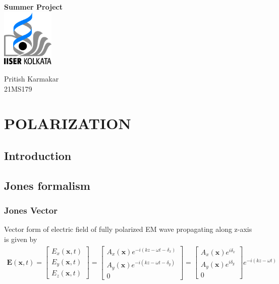 \documentclass[11pt,a4paper]{article}
\author{Pritish Karmakar}
\numberwithin{equation}{section}
\begin{document}
	\begin{titlepage}
		\vspace*{3.5cm}
		\centering
		{\Huge\bfseries Summer Project}\\
		\vspace{5cm}
		\includegraphics[width=2.5cm]{iiserk.png}

		\vspace{5cm}
		
		{\LARGE Pritish Karmakar\\}
		\vspace{0.3cm}
		{21MS179}
		\vfill
		
		
		\clearpage
		\tableofcontents
		\clearpage
		\listoftables
		\lstlistoflistings
		
	\end{titlepage}

\section{POLARIZATION}

\subsection{Introduction}

\subsection{Jones formalism}
\subsubsection{Jones Vector}
Vector form of electric field of fully polarized EM wave propagating along z-axis is given by
\begin{align}
	\textbf{E}(\textbf{x},t)=
	\begin{bmatrix}
		E_x(\textbf{x},t)\\
		E_y(\textbf{x},t)\\
		E_z(\textbf{x},t)
	\end{bmatrix} =
\begin{bmatrix}
	A_x(\textbf{x}) e^{-i(kz-\omega t-\delta_x)}\\
	A_y(\textbf{x}) e^{-i(kz-\omega t-\delta_y)}\\
	0
\end{bmatrix}=
\begin{bmatrix}
	A_x(\textbf{x})e^{i\delta_x}\\
	A_y(\textbf{x})e^{i\delta_y}\\
	0
\end{bmatrix}e^{-i(kz-\omega t)}
\end{align}
\end{document}

